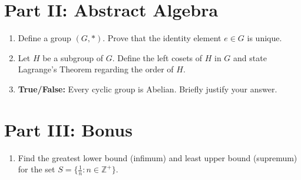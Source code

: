\section*{Part II: Abstract Algebra}

\begin{enumerate}[leftmargin=*, label=\textbf{\arabic*.}, resume]

  \item Define a group $(G, \ast)$. Prove that the identity element $e \in G$ is unique. 
  \vspace{3cm}

  \item Let $H$ be a subgroup of $G$. Define the left cosets of $H$ in $G$ and state Lagrange's Theorem regarding the order of $H$. 
  \vspace{4cm}

  \item \textbf{True/False:} Every cyclic group is Abelian. Briefly justify your answer. 
  \vspace{2cm}

\end{enumerate}

\section*{Part III: Bonus}

\begin{enumerate}[leftmargin=*, label=\textbf{\arabic*.}, resume]
  \item Find the greatest lower bound (infimum) and least upper bound (supremum) for the set $S = \{ \frac{1}{n} : n \in \mathbb{Z}^+ \}$. 
\end{enumerate}
